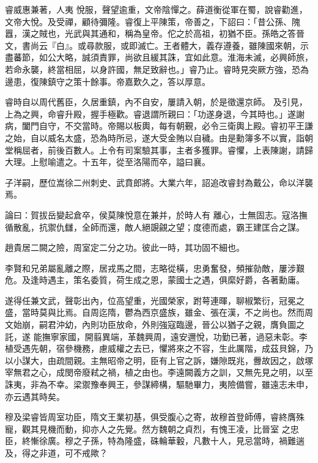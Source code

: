 \begin{pinyinscope}
 睿威惠兼著，人夷
 悅服，聲望逾重，文帝陰憚之。薛道衡從軍在蜀，說睿勸進，文帝大悅。及受禪，顧待彌隆。睿復上平陳策，帝善之，下詔曰：「昔公孫、隗囂，漢之賊也，光武與其通和，稱為皇帝。佗之於高祖，初猶不臣。孫皓之答晉文，書尚云『白』。或尋款服，或即滅亡。王者體大，義存遵養，雖陳國來朝，示盡蕃節，如公大略，誠須責罪，尚欲且緩其誅，宜如此意。淮海未滅，必興師旅，若命永襲，終當相屈，以身許國，無足致辭也。」睿乃止。睿時見突厥方強，恐為邊患，復陳鎮守之策十餘事。帝嘉歎久之，答以厚意。



 睿時自以周代舊臣，久居重鎮，內不自安，屢請入朝，於是徵還京師。
 及引見，上為之興，命睿升殿，握手極歡。睿退謂所親曰：「功遂身退，今其時也。」遂謝病，闔門自守，不交當時。帝賜以板輿，每有朝覲，必令三衛輿上殿。睿初平王謙之始，自以威名太盛，恐為時所忌，遂大受金賄以自穢。由是勳簿多不以實，詣朝堂稱屈者，前後百數人。上令有司案驗其事，主者多獲罪。睿懼，上表陳謝，請歸大理。上慰喻遣之。十五年，從至洛陽而卒，謚曰襄。



 子洋嗣，歷位嵩徐二州刺史、武賁郎將。大業六年，詔追改睿封為戴公，命以洋襲焉。



 論曰：賀拔岳變起倉卒，侯莫陳悅意在兼并，於時人有
 離心，士無固志。寇洛撫循散亂，抗禦仇讎，全師而還，敵人絕覬覦之望；度德而處，霸王建匡合之謀。



 趙貴居二闕之險，周室定二分之功。彼此一時，其功固不細也。



 李賢和兄弟屬亂離之際，居戎馬之間，志略從橫，忠勇奮發，頻摧勍敵，屢涉艱危。及逢時遇主，策名委質，荷生成之恩，蒙國士之遇，俱縻好爵，各著勳庸。



 遂得任兼文武，聲彰出內，位高望重，光國榮家，跗萼連暉，聊椒繁衍，冠冕之盛，當時莫與比焉。自周迄隋，鬱為西京盛族，雖金、張在漢，不之尚也。然而周文始崩，嗣君沖幼，內則功臣放命，外則強寇臨邊，晉公以猶子之親，膺負圖之託，遂
 能撫寧家國，開翦異端，革魏興周，遠安邇悅，功勤已著，過惡未彰。李植受遇先朝，宿參機務，慮威權之去已，懼將來之不容，生此厲階，成茲貝錦，乃以小謀大，由疏間親。主無昭帝之明，臣有上官之訴，嫌隙既兆，釁故因之，啟塚宰無君之心，成閔帝廢弒之禍，植之由也。李遠闕義方之訓，又無先見之明，以至誅夷，非為不幸。梁禦豫奉興王，參謀締構，驅馳畢力，夷險備嘗，雖遠志未申，亦云遇其時矣。



 穆及梁睿皆周室功臣，隋文王業初基，俱受腹心之寄，故穆首登師傅，睿終膺殊寵，觀其見機而動，抑亦人之先覺。然方魏朝之貞烈，有愧王凌，比晉室
 之忠臣，終慚徐廣。穆之子孫，特為隆盛，硃輪華轂，凡數十人，見忌當時，禍難遄及，得之非道，可不戒歟？



\end{pinyinscope}